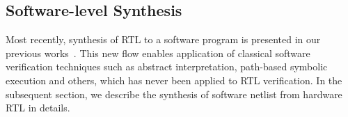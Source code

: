 \subsection{Software-level Synthesis}
Most recently, synthesis of RTL to a software program is presented 
in our previous works~\cite{mkm2015,mtk2016}.  This new flow enables application 
of classical software verification techniques such as abstract interpretation, path-based 
symbolic execution and others, which has never been applied to RTL verification.  
In the subsequent section, we describe the synthesis of software netlist 
from hardware RTL in details.     
